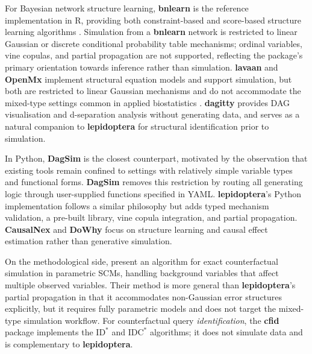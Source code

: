 \documentclass[12pt]{article}
\newcommand{\pkg}[1]{\textbf{#1}}
\newcommand{\proglang}[1]{\textsf{#1}}
\begin{document}
For Bayesian network structure learning, \pkg{bnlearn} \citep{scutari2010bnlearn}
is the reference implementation in \proglang{R}, providing both constraint-based
and score-based structure learning algorithms \citep{chickering2002optimal,
spirtes2000causation}. Simulation from a \pkg{bnlearn} network is restricted to
linear Gaussian or discrete conditional probability table mechanisms; ordinal
variables, vine copulas, and partial propagation are not supported, reflecting the
package's primary orientation towards inference rather than simulation.
\pkg{lavaan} \citep{rosseel2012lavaan} and \pkg{OpenMx} \citep{neale2016openmx}
implement structural equation models and support simulation, but both are
restricted to linear Gaussian mechanisms and do not accommodate the mixed-type
settings common in applied biostatistics \citep{lauritzen1989graphical}.
\pkg{dagitty} \citep{textor2016dagitty} provides DAG visualisation and
d-separation analysis \citep{verma1988causal} without generating data, and
serves as a natural companion to \pkg{lepidoptera} for structural identification
prior to simulation.

In \proglang{Python}, \pkg{DagSim} \citep{alhajj2023dagsim} is the closest
counterpart, motivated by the observation that existing tools remain confined to
settings with relatively simple variable types and functional forms. \pkg{DagSim}
removes this restriction by routing all generating logic through user-supplied
functions specified in YAML. \pkg{lepidoptera}'s \proglang{Python} implementation
follows a similar philosophy but adds typed mechanism validation, a pre-built
library, vine copula integration, and partial propagation. \pkg{CausalNex}
\citep{beaumont2021causalnex} and \pkg{DoWhy} \citep{sharma2020dowhy} focus on
structure learning and causal effect estimation rather than generative simulation.

On the methodological side, \citet{karvanen2024simcf} present an algorithm for
exact counterfactual simulation in parametric SCMs, handling background variables
that affect multiple observed variables. Their method is more general than
\pkg{lepidoptera}'s partial propagation in that it accommodates non-Gaussian error
structures explicitly, but it requires fully parametric models and does not target
the mixed-type simulation workflow. For counterfactual query \emph{identification},
the \pkg{cfid} package \citep{tikka2022cfid} implements the $\mathrm{ID}^*$ and
$\mathrm{IDC}^*$ algorithms; it does not simulate data and is complementary to
\pkg{lepidoptera}.
\end{document}
